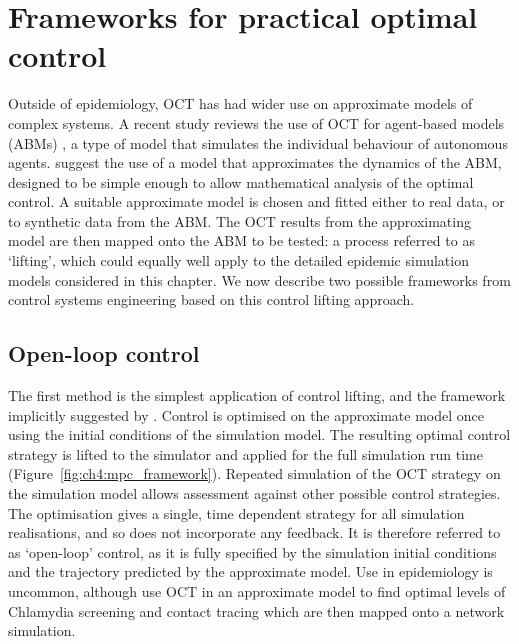 \section{Frameworks for practical optimal control}
\label{sec:ch4:Frameworks}

Outside of epidemiology, OCT has had wider use on approximate models of complex systems. A recent study reviews the use of OCT for agent-based models (ABMs) \citep{an_optimization_2017}, a type of model that simulates the individual behaviour of autonomous agents. \citet{an_optimization_2017} suggest the use of a model that approximates the dynamics of the ABM, designed to be simple enough to allow mathematical analysis of the optimal control. A suitable approximate model is chosen and fitted either to real data, or to synthetic data from the ABM. The OCT results from the approximating model are then mapped onto the ABM to be tested: a process referred to as `lifting', which could equally well apply to the detailed epidemic simulation models considered in this chapter. We now describe two possible frameworks from control systems engineering based on this control lifting approach.

\subsection*{Open-loop control}

The first method is the simplest application of control lifting, and the framework implicitly suggested by \citet{an_optimization_2017}. Control is optimised on the approximate model once using the initial conditions of the simulation model. The resulting optimal control strategy is lifted to the simulator and applied for the full simulation run time (Figure~\ref{fig:ch4:mpc_framework}). Repeated simulation of the OCT strategy on the simulation model allows assessment against other possible control strategies. The optimisation gives a single, time dependent strategy for all simulation realisations, and so does not incorporate any feedback. It is therefore referred to as `open-loop' control, as it is fully specified by the simulation initial conditions and the trajectory predicted by the approximate model. Use in epidemiology is uncommon, although \citet{clarke_approximating_2013} use OCT in an approximate model to find optimal levels of Chlamydia screening and contact tracing which are then mapped onto a network simulation.


